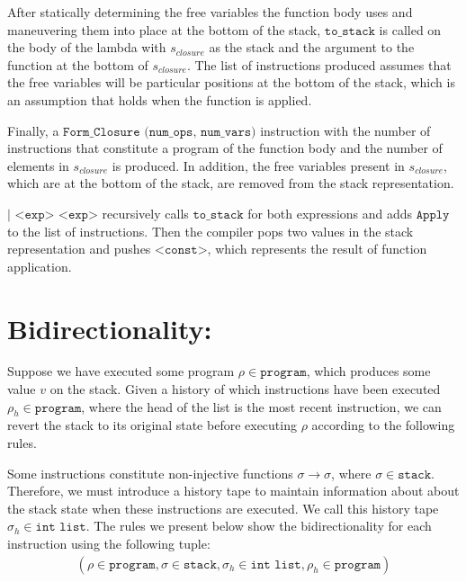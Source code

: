 \documentclass[11pt]{article}
\begin{document}
After statically determining the free variables the function body uses and maneuvering them into place at the bottom of the stack, $\texttt{to\_stack}$ is called on the body of the lambda with $s_{closure}$ as the stack and the argument to the function at the bottom of $s_{closure}$. The list of instructions produced assumes that the free variables will be particular positions at the bottom of the stack, which is an assumption that holds when the function is applied. 

Finally, a $\texttt{Form\_Closure (num\_ops,  num\_vars)}$ instruction with the number of instructions that constitute a program of the function body and the number of elements in $s_{closure}$ is produced. In addition, the free variables present in $s_{closure}$, which are at the bottom of the stack, are removed from the stack representation.

\medskip

\hspace{10mm}$\texttt{| <exp> <exp>}$ recursively calls $\texttt{to\_stack}$ for both expressions and adds $\texttt{Apply}$ to the list of instructions. Then the compiler pops two values in the stack representation and pushes $\texttt{<const>}$, which represents the result of function application.

\break{}

\section*{Bidirectionality:}

Suppose we have executed some program $\rho \in \texttt{program}$, which produces some value $v$ on the stack. Given a history of which instructions have been executed $\rho_h \in \texttt{program}$, where the head of the list is the most recent instruction, we can revert the stack to its original state before executing $\rho$ according to the following rules.

Some instructions constitute non-injective functions $\sigma \rightarrow \sigma$, where $\sigma \in \texttt{stack}$. Therefore, we must introduce a history tape to maintain information about about the stack state when these instructions are executed. We call this history tape $\sigma_h \in \texttt{int list}$. The rules we present below show the bidirectionality for each instruction using the following tuple:
\begin{align*}
    (\rho \in \texttt{program}, \sigma \in \texttt{stack}, \sigma_h \in \texttt{int list}, \rho_h \in \texttt{program})
\end{align*}
\end{document}
